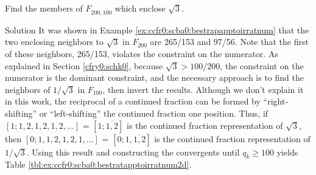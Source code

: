 \begin{vworkexamplestatement}
\label{ex:ccfr0:scba0:bestratapptoirratnum2d}
Find the members of $F_{200,\overline{100}}$ which 
enclose $\sqrt{3}$.
\end{vworkexamplestatement}
\begin{vworkexampleparsection}{Solution}
It was shown in Example \ref{ex:ccfr0:scba0:bestrapapptoirratnum}
that the two enclosing neighbors to $\sqrt{3}$ in 
$F_{200}$ are 265/153 and 97/56.  Note that the first of
these neighbors, 265/153, violates the constraint on the
numerator.
As explained in Section \cfryzeroxrefhyphen{}\ref{cfry0:schk0},
because $\sqrt{3} > 100/200$, the constraint on the
numerator is the dominant constraint, and the necessary
approach is to find the neighbors of $1/\sqrt{3}$ in
$F_{100}$, then invert the results.
Although we don't explain it in this work,
the reciprocal of a continued fraction can be formed by
``right-shifting'' or ``left-shifting'' the continued fraction one position.
Thus, if $[1;1,2,1,2,1,2, \ldots{}]$ = $[1;\overline{1,2}]$
is the continued fraction representation of $\sqrt{3}$, then
$[0;1,1,2,1,2,1, \ldots{}]$ = $[0;1,\overline{1,2}]$ is the
continued fraction representation of $1/\sqrt{3}$.  Using
this result and constructing the convergents until
$q_k \geq 100$ yields Table \ref{tbl:ex:ccfr0:scba0:bestratapptoirratnum2d}.


\end{vworkexampleparsection}
